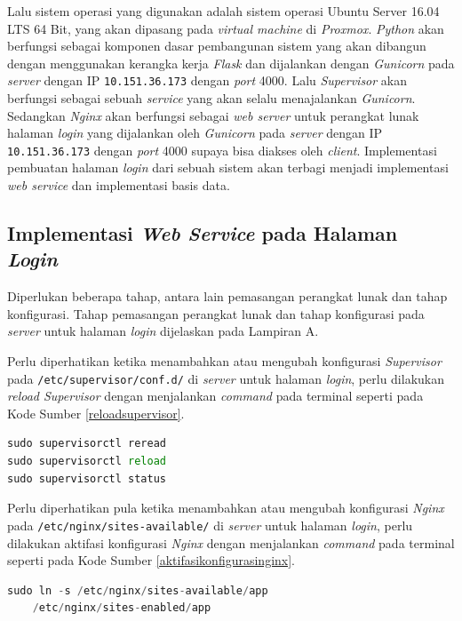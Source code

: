 Lalu sistem operasi yang digunakan adalah sistem operasi Ubuntu Server 16.04 LTS 64 Bit, yang akan dipasang pada \textit{virtual machine} di \textit{Proxmox}. \textit{Python} akan berfungsi sebagai komponen dasar pembangunan sistem yang akan dibangun dengan menggunakan kerangka kerja \textit{Flask} dan dijalankan dengan \textit{Gunicorn} pada \textit{server} dengan IP \texttt{10.151.36.173} dengan \textit{port} 4000. Lalu \textit{Supervisor} akan berfungsi sebagai sebuah \textit{service} yang akan selalu menajalankan \textit{Gunicorn}. Sedangkan \textit{Nginx} akan berfungsi sebagai \textit{web server} untuk perangkat lunak halaman \textit{login} yang dijalankan oleh \textit{Gunicorn} pada \textit{server} dengan IP \texttt{10.151.36.173} dengan \textit{port} 4000 supaya bisa diakses oleh \textit{client}. Implementasi pembuatan halaman \textit{login} dari sebuah sistem akan terbagi menjadi implementasi \textit{web service} dan implementasi basis data.

\subsection{Implementasi \textit{Web Service} pada Halaman \textit{Login}}
Diperlukan beberapa tahap, antara lain pemasangan perangkat lunak dan tahap konfigurasi. Tahap pemasangan perangkat lunak dan tahap konfigurasi pada \textit{server} untuk halaman \textit{login} dijelaskan pada Lampiran A. 

Perlu diperhatikan ketika menambahkan atau mengubah konfigurasi \textit{Supervisor} pada \texttt{/etc/supervisor/conf.d/} di \textit{server} untuk halaman \textit{login}, perlu dilakukan \textit{reload Supervisor} dengan menjalankan \textit{command} pada terminal seperti pada Kode Sumber \ref{reloadsupervisor}.
\begin{lstlisting}[frame=single,tabsize=2,breaklines,caption=Command untuk Reload Supervisor,language=Python,label=reloadsupervisor,captionpos=b]
sudo supervisorctl reread
sudo supervisorctl reload
sudo supervisorctl status
\end{lstlisting}

Perlu diperhatikan pula ketika menambahkan atau mengubah konfigurasi \textit{Nginx} pada \texttt{/etc/nginx/sites-available/} di \textit{server} untuk halaman \textit{login}, perlu dilakukan aktifasi konfigurasi \textit{Nginx} dengan menjalankan \textit{command} pada terminal seperti pada Kode Sumber \ref{aktifasikonfigurasinginx}.
\begin{lstlisting}[frame=single,tabsize=2,breaklines,caption=Command untuk mengaktifkan konfigurasi Nginx,language=Python,label=aktifasikonfigurasinginx,captionpos=b]
sudo ln -s /etc/nginx/sites-available/app 
	/etc/nginx/sites-enabled/app
\end{lstlisting}


